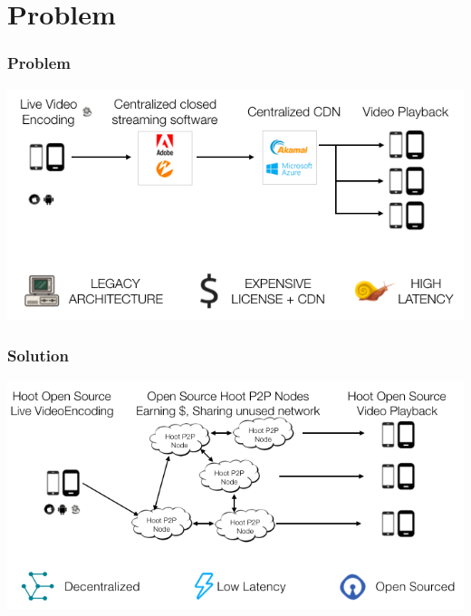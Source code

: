\documentclass[10pt,handout]{beamer}
\begin{document}
\section{Problem}
\begin{frame}[t]\frametitle{Problem}

   \includegraphics[width=1.0\textwidth]{static/problem-architecture-trans}

\end{frame}
\begin{frame}[t]\frametitle{Solution}
   \includegraphics[width=1.0\textwidth]{static/hoot-solution-trans}

\end{frame}
\end{document}
